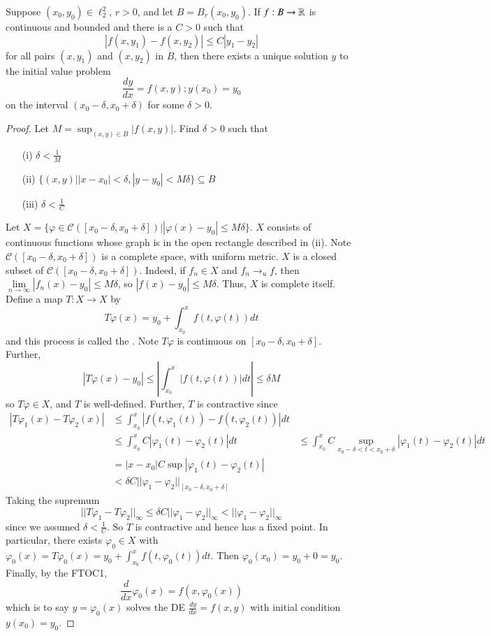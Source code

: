 \begin{theorem}
    Suppose $(x_0,y_0) \in \ell_2^2$, $r > 0$, and let $B = B_r(x_0,y_0)$. If $f:B\rightarrow \mathbb R$ is continuous and bounded and there is a $C > 0$ such that $$|f(x,y_1)-f(x,y_2)| \leq C|y_1-y_2|$$ for all pairs $(x,y_1)$ and $(x,y_2)$ in $B$, then there exists a unique solution $y$ to the initial value problem $$\frac{dy}{dx} = f(x,y); y(x_0) = y_0$$ on the interval $(x_0 - \delta,x_0+\delta)$ for some $\delta > 0$.
\end{theorem}
\begin{proof}
    Let $M = \sup_{(x,y) \in B}|f(x,y)|$. Find $\delta > 0$ such that \begin{itemize}
        \item[(i)] $\delta < \frac{1}{M}$
        \item[(ii)] $\{(x,y)\vert |x-x_0| < \delta, |y-y_0| <M\delta\} \subseteq B$
        \item[(iii)] $\delta < \frac{1}{C}$
    \end{itemize}
    Let $X = \{\varphi \in \mathcal{C}([x_0-\delta,x_0+\delta])\vert |\varphi(x)-y_0| \leq M\delta\}$. $X$ consists of continuous functions whose graph is in the open rectangle described in (ii). Note $\mathcal{C}([x_0-\delta,x_0+\delta])$ is a complete space, with uniform metric. $X$ is a closed subset of $\mathcal{C}([x_0-\delta,x_0+\delta])$. Indeed, if $f_n \in X$ and $f_n\rightarrow_u f$, then $\lim\limits_{n\rightarrow\infty}|f_n(x)-y_0| \leq M\delta$, so $|f(x) - y_0| \leq M\delta$. Thus, $X$ is complete itself. Define a map $T:X\rightarrow X$ by $$T\varphi(x) = y_0 + \int_{x_0}^xf(t,\varphi(t))dt$$ and this process is called the . Note $T\varphi$ is continuous on $[x_0-\delta,x_0+\delta]$. Further, $$|T\varphi(x) - y_0| \leq \left|\int_{x_0}^x|f(t,\varphi(t))|dt\right| \leq \delta M$$ so $T\varphi \in X$, and $T$ is well-defined. Further, $T$ is contractive since \begin{align*}
        |T\varphi_1(x) - T\varphi_2(x)|&\leq \int_{x_0}^x|f(t,\varphi_1(t)) - f(t,\varphi_2(t))|dt \\
        &\leq \int_{x_0}^x C|\varphi_1(t) - \varphi_2(t)|dt
        &\leq \int_{x_0}^xC\sup_{x_0-\delta < t < x_0+\delta}|\varphi_1(t) - \varphi_2(t)| dt \\
        &= |x-x_0|C\sup|\varphi_1(t) - \varphi_2(t)| \\
        &< \delta C||\varphi_1-\varphi_2||_{[x_0-\delta,x_0+\delta]} 
    \end{align*}
    Taking the supremum $$||T\varphi_1 - T\varphi_2||_{\infty} \leq \delta C||\varphi_1-\varphi_2||_{\infty} < ||\varphi_1-\varphi_2||_{\infty}$$ since we assumed $\delta < \frac{1}{C}$. So $T$ is contractive and hence has a fixed point. In particular, there exists $\varphi_0 \in X$ with $\varphi_0(x) = T\varphi_0(x) = y_0+\int_{x_0}^xf(t,\varphi_0(t))dt$. Then $\varphi_0(x_0) = y_0 + 0 = y_0$. Finally, by the FTOC1, $$\frac{d}{dx}\varphi_0(x) = f(x,\varphi_0(x))$$ which is to say $y = \varphi_0(x)$ solves the DE $\frac{dy}{dx} = f(x,y)$ with initial condition $y(x_0) = y_0$.
\end{proof}



